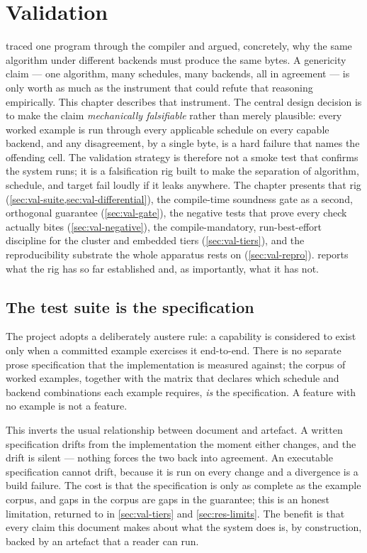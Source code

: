 \chapter{Validation}\label{ch:validation}

 traced one program through the compiler and argued,
concretely, why the same algorithm under different backends must produce the same
bytes. A genericity claim --- one algorithm, many schedules, many backends, all in
agreement --- is only worth as much as the instrument that could refute that
reasoning empirically. This chapter describes that instrument. The central design decision is to make the
claim \emph{mechanically falsifiable} rather than merely plausible: every worked
example is run through every applicable schedule on every capable backend, and any
disagreement, by a single byte, is a hard failure that names the offending cell.
The validation strategy is therefore not a smoke test that confirms the system
runs; it is a falsification rig built to make the separation of algorithm,
schedule, and target fail loudly if it leaks anywhere. The chapter presents that
rig (\cref{sec:val-suite,sec:val-differential}), the compile-time soundness gate
as a second, orthogonal guarantee (\cref{sec:val-gate}), the negative tests that
prove every check actually bites (\cref{sec:val-negative}), the
compile-mandatory, run-best-effort discipline for the cluster and embedded tiers
(\cref{sec:val-tiers}), and the reproducibility substrate the whole apparatus
rests on (\cref{sec:val-repro}).  reports what the rig has so far
established and, as importantly, what it has not.

\section{The test suite is the specification}\label{sec:val-suite}

The project adopts a deliberately austere rule: a capability is considered to
exist only when a committed example exercises it end-to-end. There is no separate
prose specification that the implementation is measured against; the corpus of
worked examples, together with the matrix that declares which schedule and backend
combinations each example requires, \emph{is} the specification. A feature with no
example is not a feature.

This inverts the usual relationship between document and artefact. A written
specification drifts from the implementation the moment either changes, and the
drift is silent --- nothing forces the two back into agreement. An executable
specification cannot drift, because it is run on every change and a divergence is a
build failure. The cost is that the specification is only as complete as the
example corpus, and gaps in the corpus are gaps in the guarantee; this is an honest
limitation, returned to in \cref{sec:val-tiers} and \cref{sec:res-limits}. The
benefit is that every claim this document makes about what the system does is,
by construction, backed by an artefact that a reader can run.

